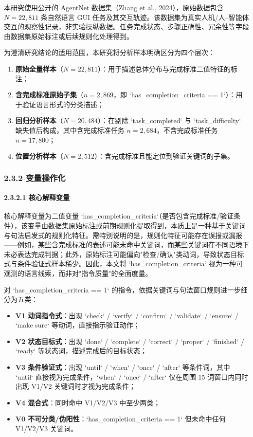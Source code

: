 \documentclass[12pt,a4paper,openany,oneside]{ctexrep}
\begin{document}
本研究使用公开的 AgentNet 数据集（Zhang et al., 2024），原始数据包含 $N=22{,}811$ 条自然语言 GUI 任务及其交互轨迹。该数据集为真实人机/人–智能体交互的观察性记录，非实验操纵数据。任务完成状态、步骤正确性、冗余性等字段由数据集原始标注或后续规则化处理得到。

为澄清研究结论的适用范围，本研究将分析样本明确区分为四个层次：

\begin{enumerate}
\item[1.] \textbf{原始全量样本}（$N=22{,}811$）：用于描述总体分布与完成标准二值特征的标注；
\item[2.] \textbf{含完成标准原始子集}（$n=2{,}869$，即 `has\_completion\_criteria == 1`）：用于验证语言形式的分类描述；
\item[3.] \textbf{回归分析样本}（$N=20{,}484$）：在剔除 `task\_completed` 与 `task\_difficulty` 缺失值后构成，其中含完成标准任务 $n=2{,}684$，不含完成标准任务 $n=17{,}800$；
\item[4.] \textbf{位置分析样本}（$N=2{,}512$）：含完成标准且能定位到验证关键词的子集。
\end{enumerate}


\subsubsection{2.3.2 变量操作化}


\paragraph{2.3.2.1 核心解释变量}


核心解释变量为二值变量 `has\_completion\_criteria`（是否包含完成标准/验证条件），该变量由数据集原始标注或前期规则化提取得到，本质上是一种基于关键词与句法启发式的规则化特征。需特别说明的是，规则化特征可能存在误报或漏报——例如，某些含完成标准的表述可能未命中关键词，而某些关键词在不同语境下未必表达完成判据；此外，原始标注可能偏向"检查/确认"类动词，导致状态目标式与条件验证式样本稀少。因此，本文将 `has\_completion\_criteria` 视为一种可观测的语言线索，而非对"指令质量"的全面度量。

对 `has\_completion\_criteria == 1` 的指令，依据关键词与句法窗口规则进一步细分为五类：

\begin{itemize}
\item \textbf{V1 动词指令式}：出现 `check` / `verify` / `confirm` / `validate` / `ensure` / `make sure` 等动词，直接指示验证动作；
\item \textbf{V2 状态目标式}：出现 `done` / `complete` / `correct` / `proper` / `finished` / `ready` 等状态词，描述完成后的目标状态；
\item \textbf{V3 条件验证式}：出现 `until` / `when` / `once` / `after` 等条件词，其中 `until` 直接视为完成条件，`when` / `once` / `after` 仅在周围 15 词窗口内同时出现 V1/V2 关键词时才视为完成条件；
\item \textbf{V4 混合式}：同时命中 V1/V2/V3 中至少两类；
\item \textbf{V0 不可分类/伪阳性}：`has\_completion\_criteria == 1` 但未命中任何 V1/V2/V3 关键词。
\end{itemize}
\end{document}
